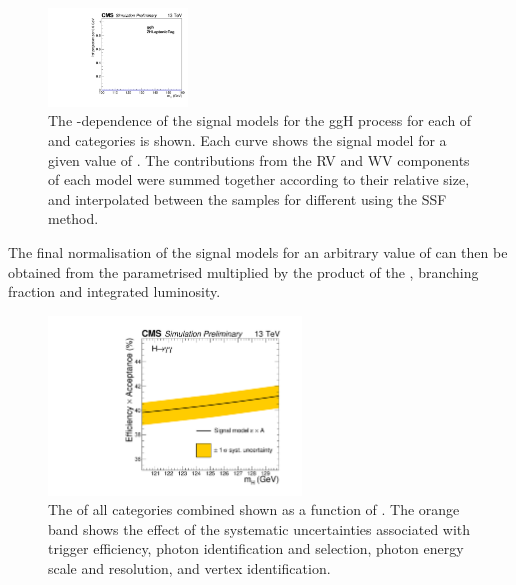 \begin{figure}[ht!]
\includegraphics[width=0.33\textwidth]{modellingFigures/DCBpG/ggh_ZHLeptonicTag_fmc_interp.pdf} 
\caption{The \mH-dependence of the signal models for the ggH process for each of \TTHTag and \VHTag categories is shown. Each curve shows the signal model for a given value of \mH. The contributions from the RV and WV components of each model were summed together according to their relative size, and interpolated between the samples for different \mH using the SSF method.}

\label{fig:model:sig_interpolation_bis}
\end{figure}

The final normalisation of the signal models for an arbitrary value of \mH can then be obtained from the parametrised \effxacc multiplied by the product of the \crosssection, branching fraction and integrated luminosity. 

\begin{figure}[ht!]
\centering
\includegraphics[width=0.6\textwidth]{modellingFigures/effAcc_vs_mass.pdf} 
\caption{The \effxacc of all categories combined shown as a function of \mH. The orange band shows the effect of the systematic uncertainties associated with trigger efficiency, photon identification and selection, photon energy scale and resolution, and vertex identification.}

\label{fig:model:sig_effxacc}
\end{figure}

